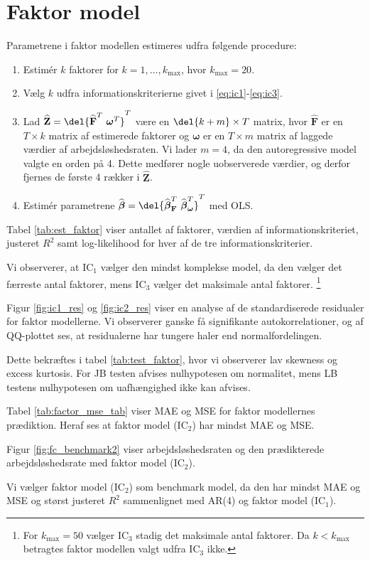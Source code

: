 \section{Faktor model}
Parametrene i faktor modellen estimeres udfra følgende procedure:
\begin{enumerate}
\item Estimér $k$ faktorer for $k = 1, \dots, k_{\max}$, hvor $k_{\max} = 20$.  
\item Vælg $k$ udfra informationskriterierne givet i \eqref{eq:ic1}-\eqref{eq:ic3}.
\item Lad \(\widehat{\textbf{Z}} = \del{\widehat{{\textbf{F}}}^T \ \boldsymbol{\omega}^T}^T\) være en \(\del{k+m} \times T\) matrix, hvor \(\widehat{{\textbf{F}}}\) er en \(T \times k\) matrix af estimerede faktorer og \(\boldsymbol{\omega}\) er en \(T \times m\) matrix af laggede værdier af arbejdsløshedsraten.
Vi lader \(m = 4\), da den autoregressive model valgte en orden på 4.
Dette medfører nogle uobserverede værdier, og derfor fjernes de første 4 rækker i \(\widehat{\textbf{Z}}\).
\item Estimér parametrene $\widehat{\boldsymbol{\beta}} = \del{ \widehat{\boldsymbol{\beta}}^T_{\textbf{F}} \ \widehat{\boldsymbol{\beta}}^T_{\boldsymbol{\omega}}}^T$ med OLS.
\end{enumerate}

Tabel \ref{tab:est_faktor} viser antallet af faktorer, værdien af informationskriteriet, justeret \(R^2\) samt log-likelihood for hver af de tre informationskriterier. 


Vi observerer, at IC$_1$ vælger den mindst komplekse model, da den vælger det færreste antal faktorer, mens IC$_3$ vælger det maksimale antal faktorer. \footnote{For \(k_\text{max} = 50\) vælger IC\(_3\) stadig det maksimale antal faktorer. Da \(k<k_\text{max}\) betragtes faktor modellen valgt udfra IC\(_3\) ikke.} 

Figur \ref{fig:ic1_res} og \ref{fig:ic2_res} viser en analyse af de standardiserede residualer for faktor modellerne.
Vi observerer ganske få signifikante autokorrelationer, og af QQ-plottet ses, at residualerne har tungere haler end normalfordelingen.
%

%
Dette bekræftes i tabel \ref{tab:test_faktor}, hvor vi observerer lav skewness og excess kurtosis. 
For JB testen afvises nulhypotesen om normalitet, mens LB testens nulhypotesen om uafhængighed ikke kan afvises. 

Tabel \ref{tab:factor_mse_tab} viser MAE og MSE for faktor modellernes prædiktion.
Heraf ses at faktor model (IC\(_2\)) har mindst MAE og MSE.



Figur \ref{fig:fc_benchmark2} viser arbejdsløshedsraten og den prædikterede arbejdsløshedsrate med faktor model (IC\(_2\)).

Vi vælger faktor model (IC\(_2\)) som benchmark model, da den har mindst MAE og MSE og størst justeret \(R^2\) sammenlignet med AR(4) og faktor model (IC\(_1\)).
